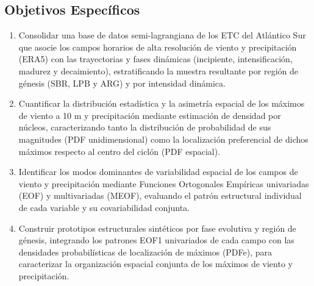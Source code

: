 \subsection{Objetivos Específicos}
\begin{enumerate}
    \item Consolidar una base de datos semi-lagrangiana de los ETC del Atlántico Sur que asocie los campos horarios de alta resolución de viento y precipitación (ERA5) con las trayectorias y fases dinámicas (incipiente, intensificación, madurez y decaimiento), estratificando la muestra resultante por región de génesis (SBR, LPB y ARG) y por intensidad dinámica.

    \item Cuantificar la distribución estadística y la asimetría espacial de los máximos de viento a 10 m y precipitación mediante estimación de densidad por núcleos, caracterizando tanto la distribución de probabilidad de sus magnitudes (PDF unidimensional) como la localización preferencial de dichos máximos respecto al centro del ciclón (PDF espacial).

    \item Identificar los modos dominantes de variabilidad espacial de los campos de viento y precipitación mediante Funciones Ortogonales Empíricas univariadas (EOF) y multivariadas (MEOF), evaluando el patrón estructural individual de cada variable y su covariabilidad conjunta.

    \item Construir prototipos estructurales sintéticos por fase evolutiva y región de génesis, integrando los patrones EOF1 univariados de cada campo con las densidades probabilísticas de localización de máximos (PDFe), para caracterizar la organización espacial conjunta de los máximos de viento y precipitación.
\end{enumerate}
